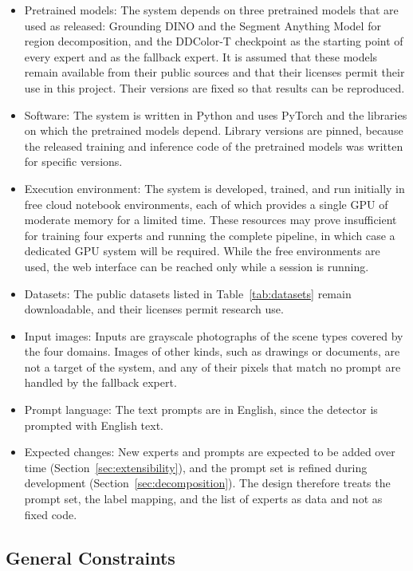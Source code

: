 \documentclass{FastFyp}
\begin{document}
\begin{itemize}
    \item Pretrained models: The system depends on three pretrained models that are used as released: Grounding DINO and the Segment Anything Model for region decomposition, and the DDColor-T checkpoint as the starting point of every expert and as the fallback expert. It is assumed that these models remain available from their public sources and that their licenses permit their use in this project. Their versions are fixed so that results can be reproduced.
    \item Software: The system is written in Python and uses PyTorch and the libraries on which the pretrained models depend. Library versions are pinned, because the released training and inference code of the pretrained models was written for specific versions.
    \item Execution environment: The system is developed, trained, and run initially in free cloud notebook environments, each of which provides a single GPU of moderate memory for a limited time. These resources may prove insufficient for training four experts and running the complete pipeline, in which case a dedicated GPU system will be required. While the free environments are used, the web interface can be reached only while a session is running.
    \item Datasets: The public datasets listed in Table~\ref{tab:datasets} remain downloadable, and their licenses permit research use.
    \item Input images: Inputs are grayscale photographs of the scene types covered by the four domains. Images of other kinds, such as drawings or documents, are not a target of the system, and any of their pixels that match no prompt are handled by the fallback expert.
    \item Prompt language: The text prompts are in English, since the detector is prompted with English text.
    \item Expected changes: New experts and prompts are expected to be added over time (Section~\ref{sec:extensibility}), and the prompt set is refined during development (Section~\ref{sec:decomposition}). The design therefore treats the prompt set, the label mapping, and the list of experts as data and not as fixed code.
\end{itemize}

\subsection{General Constraints}
\end{document}
